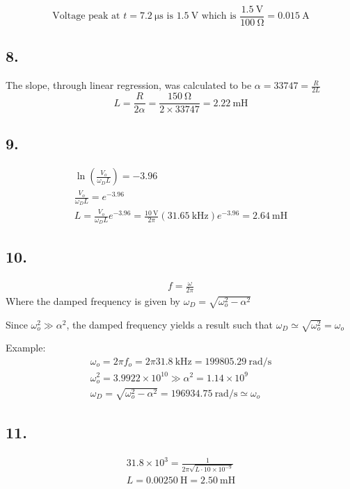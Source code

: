 \documentclass[12pt,letterpaper]{article}
\begin{document}
$$\text{Voltage peak at } t = \SI{7.2}{\micro\second} \text{ is } \SI{1.5}{\volt} \text{ which is } \frac{\SI{1.5}{\volt}}{\SI{100}{\ohm}} = \SI{0.015}{\ampere}$$
\subsection*{8.}

The slope, through linear regression, was calculated to be $\alpha = 33747 = \frac{R}{2L}$
$$L=\frac{R}{2\alpha} = \frac{\SI{150}{\ohm}}{2\times33747} = \SI{2.22}{\milli\henry}$$

\subsection*{9.}
\begin{gather*}
\ln\left(\frac{V_o}{\omega_D L}\right) = - 3.96\\
\frac{V_o}{\omega_D L} = e^{-3.96}\\
L=\frac{V_o}{\omega_D L} e^{-3.96} = \frac{\SI{10}{\volt}}{2\pi} (\SI{31.65}{\kilo\hertz}) e^{-3.96} = \SI{2.64}{\milli\henry}
\end{gather*}

\subsection*{10.}
\begin{gather*}
f = \frac{\omega}{2\pi}
\end{gather*}
Where the damped frequency is given by $\omega_D = \sqrt{\omega_o^2-\alpha ^2}$

Since $\omega_o^2 \gg \alpha ^2$, the damped frequency yields a result such that $\omega_D \simeq \sqrt{\omega_o^2} = \omega_o$

Example:
\begin{gather*}
\omega_o = 2\pi f_o = 2\pi \SI{31.8}{\kilo\hertz} = \SI{199805.29}{\radian\per\second}\\
\omega_o^2 = 3.9922\times 10^{10} \gg \alpha^2 = 1.14\times 10^9\\
\omega_D = \sqrt{\omega_o ^2 - \alpha^2} = \SI{196934.75}{\radian\per\second} \simeq \omega_o
\end{gather*}

\subsection*{11.}
\begin{gather*}
31.8\times10^3 = \frac{1}{2\pi \sqrt{L \cdot 10\times10^{-9}}}\\
L = \SI{0.00250}{\henry} = \SI{2.50}{\milli\henry} 
\end{gather*}
\end{document}
